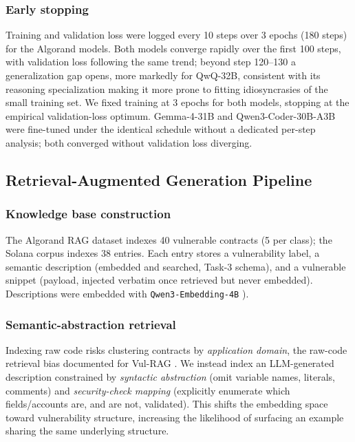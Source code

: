 \documentclass[lettersize,journal]{IEEEtran}
\begin{document}
\subsubsection{Early stopping}
\label{sec:loss_analysis}
Training and validation loss were logged every 10 steps over 3 epochs (180 steps) for the Algorand
models. Both models converge rapidly over the first 100 steps, with validation loss following the
same trend; beyond step 120--130 a generalization gap opens, more markedly for QwQ-32B, consistent
with its reasoning specialization making it more prone to fitting idiosyncrasies of the small
training set. We fixed training at 3 epochs for both models, stopping at the empirical
validation-loss optimum. Gemma-4-31B and Qwen3-Coder-30B-A3B were fine-tuned under the identical
schedule without a dedicated per-step analysis; both converged without validation loss diverging.

\subsection{Retrieval-Augmented Generation Pipeline}
\label{sec:rag_implementation}

\subsubsection{Knowledge base construction}
The Algorand RAG dataset indexes 40 vulnerable contracts (5 per class); the Solana corpus indexes 38
entries. Each entry stores a vulnerability label, a
semantic description (embedded and searched, Task-3 schema), and a vulnerable snippet (payload,
injected verbatim once retrieved but never embedded). Descriptions were embedded with
\texttt{Qwen3-Embedding-4B} \cite{qwen3_embedding_2025}).

\subsubsection{Semantic-abstraction retrieval}
\label{sec:sec_code_desc}
Indexing raw code risks clustering contracts by \emph{application domain}, the raw-code retrieval 
bias documented for Vul-RAG \cite{vulrag2024}. We instead index
an LLM-generated description constrained by \emph{syntactic abstraction} (omit variable names,
literals, comments) and \emph{security-check mapping} (explicitly enumerate which fields/accounts
are, and are not, validated). This shifts the embedding space toward vulnerability structure, 
increasing the likelihood of surfacing an example sharing the same underlying structure.
\end{document}
